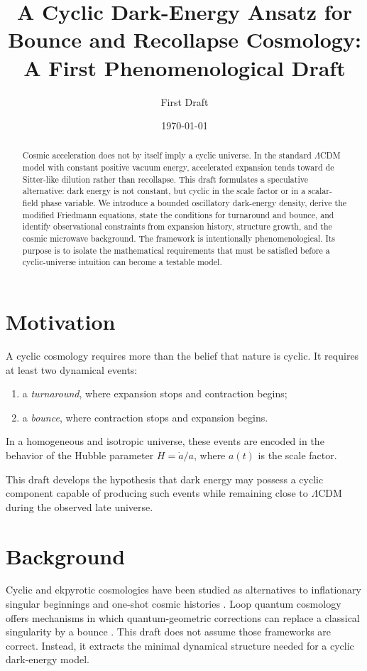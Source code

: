\documentclass[11pt]{article}
\title{A Cyclic Dark-Energy Ansatz for Bounce and Recollapse Cosmology:\\A First Phenomenological Draft}
\author{First Draft}
\date{\today}
\theoremstyle{remark}
\begin{document}
\maketitle

\begin{abstract}
Cosmic acceleration does not by itself imply a cyclic universe. In the standard $\Lambda$CDM model with constant positive vacuum energy, accelerated expansion tends toward de Sitter-like dilution rather than recollapse. This draft formulates a speculative alternative: dark energy is not constant, but cyclic in the scale factor or in a scalar-field phase variable. We introduce a bounded oscillatory dark-energy density, derive the modified Friedmann equations, state the conditions for turnaround and bounce, and identify observational constraints from expansion history, structure growth, and the cosmic microwave background. The framework is intentionally phenomenological. Its purpose is to isolate the mathematical requirements that must be satisfied before a cyclic-universe intuition can become a testable model.
\end{abstract}

\section{Motivation}
A cyclic cosmology requires more than the belief that nature is cyclic. It requires at least two dynamical events:
\begin{enumerate}[leftmargin=2em]
    \item a \emph{turnaround}, where expansion stops and contraction begins;
    \item a \emph{bounce}, where contraction stops and expansion begins.
\end{enumerate}
In a homogeneous and isotropic universe, these events are encoded in the behavior of the Hubble parameter $H=\dot a/a$, where $a(t)$ is the scale factor.

This draft develops the hypothesis that dark energy may possess a cyclic component capable of producing such events while remaining close to $\Lambda$CDM during the observed late universe.

\section{Background}
Cyclic and ekpyrotic cosmologies have been studied as alternatives to inflationary singular beginnings and one-shot cosmic histories \cite{Lehners2008,SteinhardtTurok2002}. Loop quantum cosmology offers mechanisms in which quantum-geometric corrections can replace a classical singularity by a bounce \cite{Cailleteau2009}. This draft does not assume those frameworks are correct. Instead, it extracts the minimal dynamical structure needed for a cyclic dark-energy model.
\end{document}
